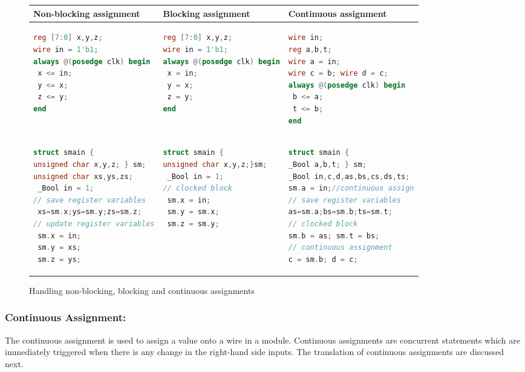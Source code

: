 \begin{figure*}[htbp]
\scriptsize
\begin{tabular}{l|l|l}
\hline
Non-blocking assignment & Blocking assignment & Continuous assignment \\
\hline
\begin{lstlisting}[mathescape=true,language=Verilog]
reg [7:0] x,y,z;
wire in = 1'b1;
always @(posedge clk) begin
 x <= in;
 y <= x;
 z <= y;
end
\end{lstlisting}
&
\begin{lstlisting}[mathescape=true,language=Verilog]
reg [7:0] x,y,z;
wire in = 1'b1;
always @(posedge clk) begin
 x = in;
 y = x;
 z = y;
end
\end{lstlisting}
&
\begin{lstlisting}[mathescape=true,language=Verilog]
wire in;
reg a,b,t;
wire a = in;
wire c = b; wire d = c; 
always @(posedge clk) begin
 b <= a;
 t <= b;
end 
\end{lstlisting}
\\
\hline 
\begin{lstlisting}[mathescape=true,language=C]
struct smain { 
unsigned char x,y,z; } sm;
unsigned char xs,ys,zs;
 _Bool in = 1;
// save register variables
 xs=sm.x;ys=sm.y;zs=sm.z;
// update register variables
 sm.x = in;
 sm.y = xs;
 sm.z = ys;
\end{lstlisting}
&
\begin{lstlisting}[mathescape=true,language=C]
struct smain {
unsigned char x,y,z;}sm;
 _Bool in = 1;
// clocked block
 sm.x = in;
 sm.y = sm.x;
 sm.z = sm.y;
\end{lstlisting}
&
\begin{lstlisting}[mathescape=true,language=C]
struct smain {
_Bool a,b,t; } sm;
_Bool in,c,d,as,bs,cs,ds,ts;
sm.a = in;//continuous assign
// save register variables
as=sm.a;bs=sm.b;ts=sm.t;
// clocked block
sm.b = as; sm.t = bs;
// continuous assignment 
c = sm.b; d = c;
\end{lstlisting}
\\
\hline
\end{tabular}
\caption{Handling non-blocking, blocking and continuous assignments}
\label{figure:block}
\end{figure*}

\subsubsection{Continuous Assignment:}
The continuous assignment is used to assign a value onto a 
wire in a module. Continuous assignments are concurrent statements 
which are immediately triggered when there is any change 
in the right-hand side inputs. The translation of continuous 
assignments are discussed next. 

